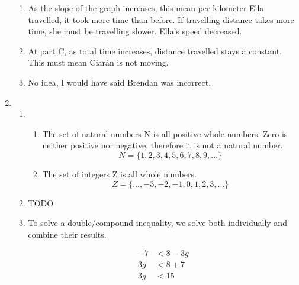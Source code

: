 \documentclass[11pt]{article}
\begin{document}
\begin{enumerate}
\begin{enumerate}
            \item
                As the slope of the graph increases, this mean per kilometer Ella travelled, it took more time than before.
                If travelling distance takes more time, she must be travelling slower. Ella's speed decreased.
            \item 
                At part C, as total time increases, distance travelled stays a constant. This must mean Ciarán is not moving.
            \item
                No idea, I would have said Brendan was incorrect.
        \end{enumerate}
    
    \pagebreak
    \item
        \begin{enumerate}
            \item
                \begin{enumerate}
                    \item
                        The set of natural numbers N is all positive whole numbers. Zero is neither positive nor negative, therefore it is not a natural number.\\
                        \begin{equation*}
                            N = \{1, 2, 3, 4, 5, 6, 7, 8, 9, ...\}
                        \end{equation*}
                    \item
                        The set of integers Z is all whole numbers.
                        \begin{equation*}
                            Z = \{..., -3, -2, -1, 0, 1, 2, 3,...\}
                        \end{equation*}
                    \end{enumerate}
            \item
                TODO
            \item
                To solve a double/compound inequality, we solve both individually and combine their results.
                \begin{minipage}{0.5\textwidth}
                        \begin{equation*}
                            \begin{split}
                                -7&<8-3g\\
                                3g&<8+7\\
                                3g&<15\\

\end{split}
\end{equation*}
\end{minipage}
\end{enumerate}
\end{enumerate}
\end{document}

